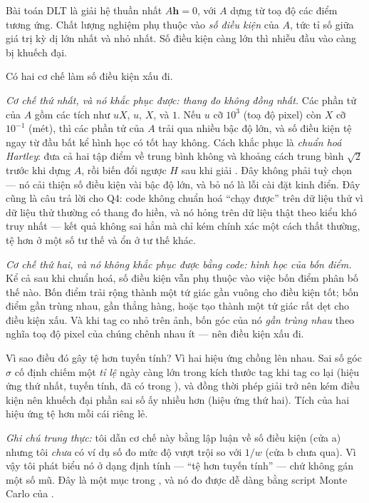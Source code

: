 \documentclass[../../marker.tex]{subfiles}
\begin{document}
Bài toán DLT là giải hệ thuần nhất \(A\mathbf{h} = 0\), với \(A\) dựng từ toạ độ các điểm tương ứng. Chất lượng nghiệm phụ thuộc vào \emph{số điều kiện} của \(A\), tức tỉ số giữa giá trị kỳ dị lớn nhất và nhỏ nhất. Số điều kiện càng lớn thì nhiễu đầu vào càng bị khuếch đại.

Có hai cơ chế làm số điều kiện xấu đi.

\emph{Cơ chế thứ nhất, và nó khắc phục được: thang đo không đồng nhất.} Các phần tử của \(A\) gồm các tích như \(u X\), \(u\), \(X\), và \(1\). Nếu \(u\) cỡ \(10^3\) (toạ độ pixel) còn \(X\) cỡ \(10^{-1}\) (mét), thì các phần tử của \(A\) trải qua nhiều bậc độ lớn, và số điều kiện tệ ngay từ đầu bất kể hình học có tốt hay không. Cách khắc phục là \emph{chuẩn hoá Hartley}: đưa cả hai tập điểm về trung bình không và khoảng cách trung bình \(\sqrt{2}\) trước khi dựng \(A\), rồi biến đổi ngược \(H\) sau khi giải \cite[§4.4]{hartley2004}. Đây không phải tuỳ chọn --- nó cải thiện số điều kiện vài bậc độ lớn, và bỏ nó là lỗi cài đặt kinh điển. Đây cũng là câu trả lời cho Q4: code không chuẩn hoá ``chạy được'' trên dữ liệu thử vì dữ liệu thử thường có thang đo hiền, và nó hỏng trên dữ liệu thật theo kiểu khó truy nhất --- kết quả không sai hẳn mà chỉ kém chính xác một cách thất thường, tệ hơn ở một số tư thế và ổn ở tư thế khác.

\emph{Cơ chế thứ hai, và nó không khắc phục được bằng code: hình học của bốn điểm.} Kể cả sau khi chuẩn hoá, số điều kiện vẫn phụ thuộc vào việc bốn điểm phân bố thế nào. Bốn điểm trải rộng thành một tứ giác gần vuông cho điều kiện tốt; bốn điểm gần trùng nhau, gần thẳng hàng, hoặc tạo thành một tứ giác rất dẹt cho điều kiện xấu. Và khi tag co nhỏ trên ảnh, bốn góc của nó \emph{gần trùng nhau} theo nghĩa toạ độ pixel của chúng chênh nhau ít --- nên điều kiện xấu đi.

Vì sao điều đó gây tệ hơn tuyến tính? Vì hai hiệu ứng chồng lên nhau. Sai số góc \(\sigma\) cố định chiếm một \emph{tỉ lệ} ngày càng lớn trong kích thước tag khi tag co lại (hiệu ứng thứ nhất, tuyến tính, đã có trong ), và đồng thời phép giải trở nên kém điều kiện nên khuếch đại phần sai số ấy nhiều hơn (hiệu ứng thứ hai). Tích của hai hiệu ứng tệ hơn mỗi cái riêng lẻ.

\emph{Ghi chú trung thực:} tôi dẫn cơ chế này bằng lập luận về số điều kiện (cửa a) nhưng tôi \emph{chưa} có ví dụ số đo mức độ vượt trội so với \(1/w\) (cửa b chưa qua). Vì vậy tôi phát biểu nó ở dạng định tính --- ``tệ hơn tuyến tính'' --- chứ không gán một số mũ. Đây là một mục trong , và nó đo được dễ dàng bằng script Monte Carlo của .
\end{document}

